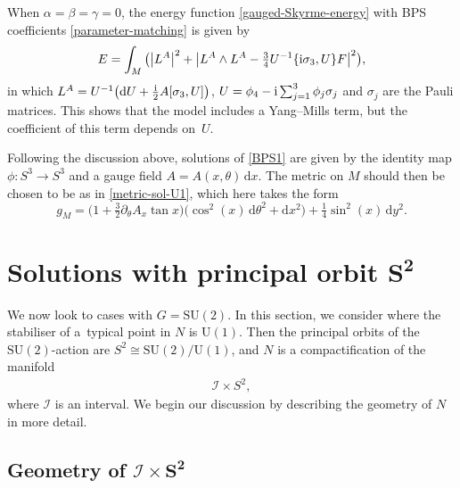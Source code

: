 \documentclass[10pt,a4paper]{amsart}
\newcommand{\II}{{\mathcal{I}}}
\newcommand{\SU}{{\mathrm{SU}}}
\newcommand{\U}{{\mathrm{U}}}
\newcommand{\1}{{\mathbb{1}}}
\def \d{\mathrm{d}}
\numberwithin{equation}{section}
\begin{document}
When $\alpha=\beta=\gamma=0$, the energy function \eqref{gauged-Skyrme-energy} with BPS coefficients \eqref{parameter-matching} is given by
\begin{equation*}
E = \int_M \big(\big|L^A\big|^2 + \big|L^A\wedge L^A-\tfrac{3}{4}U^{-1}\{{\rm i}\sigma_3,U\}F\big|^2\big),
\end{equation*}
in which $L^A=U^{-1}\bigl(\d U + \tfrac{\rm i}{2}A[\sigma_3,U]\bigr)$, $U=\phi_4-{\rm i}\sum_{j=1}^3\phi_j\sigma_j$ and $\sigma_j$ are the Pauli matrices. This shows that the model includes a Yang--Mills term, but the coefficient of this term depends on~$U$.

Following the discussion above, solutions of \eqref{BPS1} are given by the identity map $\phi\colon S^3\to S^3$ and a gauge field $A=A(x,\theta)\,\d x$.
The metric on $M$ should then be chosen to be as in \eqref{metric-sol-U1}, which here takes the form
\begin{equation*}
g_M = \bigl(1+\tfrac{3}{2}{\partial_\theta A_x}\tan x\bigr)\bigl(\cos^2(x)\,\d\theta^2 + \d x^2\bigr) + \tfrac14\sin^2 (x)\,\d y^2.
\end{equation*}

\section[Solutions with principal orbit S\^{}2]{Solutions with principal orbit $\boldsymbol{S^2}$}\label{sec:princ-orbit-S2}

We now look to cases with $G=\SU(2)$. In this section, we consider where the stabiliser of a~typical point in $N$ is $\U(1)$. Then the principal orbits of the $\SU(2)$-action are $S^2\cong\SU(2)/\U(1)$, and $N$ is a compactification of the manifold
\begin{gather*}
 \II\times S^2,
\end{gather*}
where $\II$ is an interval. We begin our discussion by describing the geometry of $N$ in more detail.

\subsection[Geometry of I times S\^{}2]{Geometry of $\boldsymbol{\II\times S^2}$}
\end{document}
